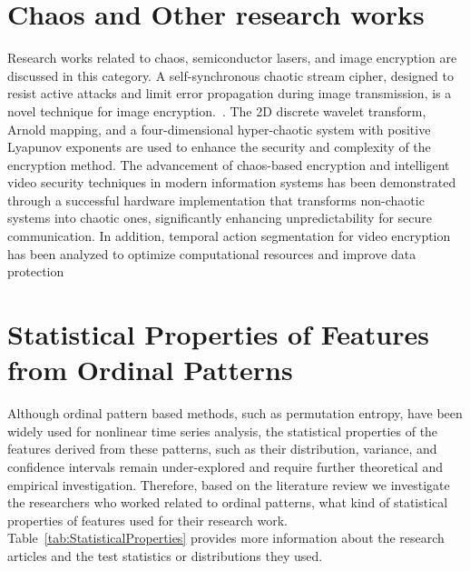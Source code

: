 \section{Chaos and Other research works}\label{Sec:ReviewTopicOthers}
Research works related to chaos, semiconductor lasers, and image encryption are discussed in this category. 
A self-synchronous chaotic stream cipher, designed to resist active attacks and limit error propagation during image transmission, is a novel technique for image encryption.~\cite{Fan2018}. The 2D discrete wavelet transform, Arnold mapping, and a four-dimensional hyper-chaotic system with positive Lyapunov exponents are used to enhance the security and complexity of the encryption method. The advancement of chaos-based encryption and intelligent video security techniques in modern information systems has been demonstrated through a successful hardware implementation that transforms non-chaotic systems into chaotic ones, significantly enhancing unpredictability for secure communication. In addition, temporal action segmentation for video encryption has been analyzed to optimize computational resources and improve data protection~\cite{Gao2024,Liu2024k}

\section{Statistical Properties of Features from Ordinal Patterns}\label{Sec:StatisitcalProperty}

Although ordinal pattern based methods, such as permutation entropy, have been widely used for nonlinear time series analysis, the statistical properties of the features derived from these patterns, such as their distribution, variance, and confidence intervals remain under-explored and require further theoretical and empirical investigation. Therefore, based on the literature review we investigate the researchers who worked related to ordinal patterns, what kind of statistical properties of features used for their research work. Table~\ref{tab:StatisticalProperties} provides more information about the research articles and the test statistics or distributions they used.



